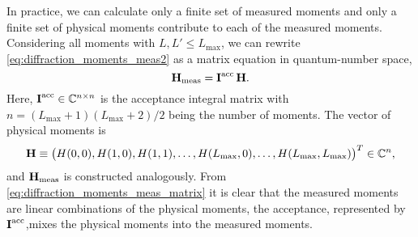 In practice, we can calculate only a finite set of measured moments
and only a finite set of physical moments contribute to each of the
measured moments.  Considering all moments with $L, L' \leq
L_\text{max}$, we can rewrite \cref{eq:diffraction_moments_meas2} as a
matrix equation in quantum-number space, \ie
\begin{equation}
  \label{eq:diffraction_moments_meas_matrix}
  \bm{\mathrm{H}}_\text{meas}
  = \bm{\mathrm{I}}^\text{acc}\, \bm{\mathrm{H}}.
\end{equation}
Here, $\bm{\mathrm{I}}^\text{acc} \in \mathbb{C}^{n \times n}$ is the
acceptance integral matrix with $n = (L_\text{max} + 1) (L_\text{max}
+ 2) / 2$ being the number of moments.  The vector of physical moments
is
\begin{equation}
  \bm{\mathrm{H}}
  \equiv \begin{pmatrix}
    H(0, 0),
    H(1, 0),
    H(1, 1),
    \ldots,
    H(L_\text{max}, 0),
    \ldots,
    H(L_\text{max}, L_\text{max})
  \end{pmatrix}^T
  \in \mathbb{C}^n,
\end{equation}
and $\bm{\mathrm{H}}_\text{meas}$ is constructed analogously.  From
\cref{eq:diffraction_moments_meas_matrix} it is clear that the
measured moments are linear combinations of the physical moments, \ie
the acceptance, represented by $\bm{\mathrm{I}}^\text{acc}$,mixes the physical
moments into the measured moments.

